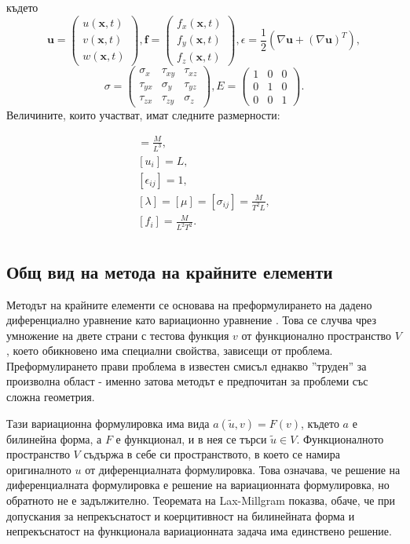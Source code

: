 \documentclass{report}
\begin{document}
	където 
	\[
	\mathbf{u} = 
	\begin{pmatrix}
		u(\mathbf{x},t)\\v(\mathbf{x},t)\\w(\mathbf{x},t)
	\end{pmatrix},
	\mathbf{f} = 
	\begin{pmatrix}
		f_x(\mathbf{x},t)\\f_y(\mathbf{x},t)\\f_z(\mathbf{x},t)
	\end{pmatrix},
	\epsilon = \frac{1}{2}(\nabla \mathbf{u} + (\nabla \mathbf{u})^T),
	\]
	\[
	\sigma = 
	\begin{pmatrix}
		\sigma_{x} & \tau_{xy} & \tau_{xz} \\
		\tau_{yx} & \sigma_{y} & \tau_{yz} \\
		\tau_{zx} & \tau_{zy} & \sigma_z
	\end{pmatrix}
	,
	E=
	\begin{pmatrix}
		1 & 0 & 0 \\
		0 & 1 & 0 \\
		0 & 0 & 1
	\end{pmatrix}.
	\]
	Величините, които участват, имат следните размерности:
	
	\begin{align*}
		[\rho ]=\frac{M}{L^3}, \\
		[u_i]=L,\\
		[\epsilon_{ij}]=1,\\
		[\lambda]=[\mu ]=[\sigma_{ij}]=\frac{M}{T^2L},\\
		[f_i]=\frac{M}{L^2T^2}.\\
	\end{align*}
	
	\subsection{Общ вид на метода на крайните елементи}
	
	Методът на крайните елементи се основава на преформулирането на дадено диференциално уравнение като вариационно уравнение \cite{larson2013finite}. Това се случва чрез умножение на двете страни с тестова функция $v$ от функционално пространство $V$, което обикновено има специални свойства, зависещи от проблема. Преформулирането прави проблема в известен смисъл еднакво ''труден'' за произволна област - именно затова методът е предпочитан за проблеми със сложна геометрия. 
	
	Тази вариационна формулировка има вида $a(\tilde{u},v)=F(v)$, където $a$ е билинейна форма, а $F$ е функционал, и в нея се търси $\tilde{u} \in V$. Функционалното пространство $V$ съдържа в себе си пространството, в което се намира оригиналното $u$ от диференциалната формулировка. Това означава, че решение на диференциалната формулировка е решение на вариационната формулировка, но обратното не е задължително. Теоремата на Lax-Millgram показва, обаче, че при допускания за непрекъснатост и коерцитивност на билинейната форма и непрекъснатост на функционала вариационната задача има единствено решение.
	
\end{document}
